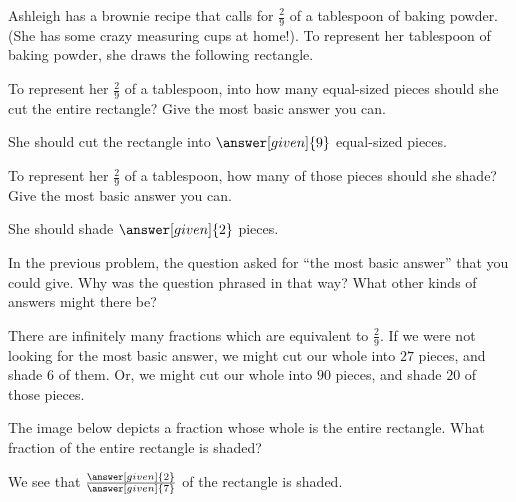 \documentclass[nooutcomes]{ximera}
\begin{document}
\begin{problem}
Ashleigh has a brownie recipe that calls for $\frac{2}{9}$ of a tablespoon of baking powder.  (She has some crazy measuring cups at home!). To represent her tablespoon of baking powder, she draws the following rectangle.
\begin{center}  \end{center}

To represent her $\frac{2}{9}$ of a tablespoon, into how many equal-sized pieces should she cut the entire rectangle?  Give the most basic answer you can.

\begin{prompt}
She should cut the rectangle into $ \answer[given]{9}$ equal-sized pieces.
\end{prompt}

To represent her $\frac{2}{9}$ of a tablespoon, how many of those pieces should she shade?  Give the most basic answer you can.

\begin{prompt}
She should shade $\answer[given]{2}$ pieces.
\end{prompt}

\end{problem}



\begin{problem}
In the previous problem, the question asked for ``the most basic answer'' that you could give.  Why was the question phrased in that way?  What other kinds of answers might there be?
\begin{freeResponse}
\begin{hint}
	There are infinitely many fractions which are equivalent to $\frac{2}{9}$.  If we were not looking for the most basic answer, we might cut our whole into $27$ pieces, and shade $6$ of them.  Or, we might cut our whole into $90$ pieces, and shade $20$ of those pieces.
\end{hint}
\end{freeResponse}
\end{problem}




\begin{problem}
The image below depicts a fraction whose whole is the entire rectangle.  What fraction of the entire rectangle is shaded?
\begin{center} \end{center}

\begin{prompt}
We see that $\frac{\answer[given]{2}}{\answer[given]{7}}$ of the rectangle is shaded.
\end{prompt}

\end{problem}
\end{document}
